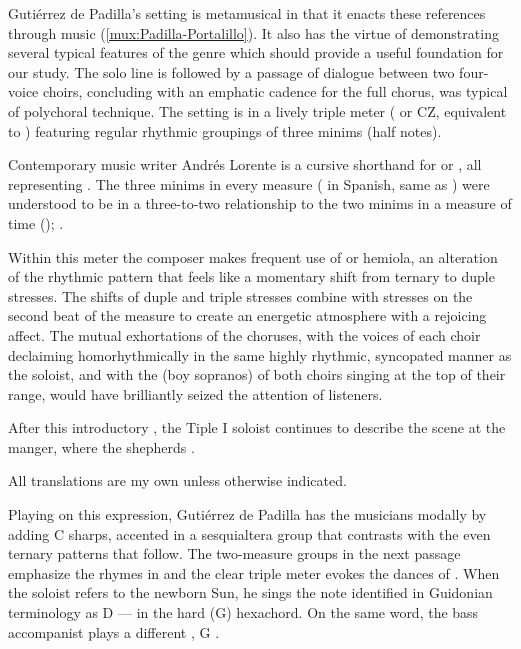 Gutiérrez de Padilla's setting is metamusical in that it enacts these
references through music (\cref{mux:Padilla-Portalillo}).
It also has the virtue of demonstrating several typical features of the genre
which should provide a useful foundation for our study.
The solo line is followed by a passage of dialogue between two four-voice
choirs, concluding with an emphatic cadence for the full chorus, was typical of
polychoral technique.
The setting is in a lively triple meter (\meterCZ{} or CZ, equivalent to
\meterCThree) featuring regular rhythmic groupings of three minims (half
notes).
\begin{Footnote}
    Contemporary music writer Andrés Lorente \meterCZ{} is a cursive shorthand
    for \meterCThreeTwo or \meterCThree, all representing .
    The three minims in every measure ( in Spanish, same as
    ) were understood to be in a three-to-two relationship to the
    two minims in a measure of  time ();
    \autocites
    [156, 165, 210]{Lorente:Porque}
    [537]{Cerone:Melopeo}
    [11]{Cashner:WLSCM32}.
\end{Footnote}
Within this meter the composer makes frequent use of  or
hemiola, an alteration of the rhythmic pattern that feels like a momentary
shift from ternary to duple stresses.
The shifts of duple and triple stresses combine with stresses on the second
beat of the measure to create an energetic atmosphere with a rejoicing affect.  
The mutual exhortations of the choruses, with the voices of each choir declaiming
homorhythmically in the same highly rhythmic, syncopated manner as the soloist,
and with the  (boy sopranos) of both choirs singing at the top of
their range, would have brilliantly seized the attention of listeners.

After this introductory , the Tiple I soloist continues to
describe the scene at the manger, where the shepherds .%
\begin{Footnote}
    All translations are my own unless otherwise indicated.
\end{Footnote}
Playing on this expression, Gutiérrez de Padilla has the musicians
 modally by adding C sharps, accented in a sesquialtera group that
contrasts with the even ternary patterns that follow.
The two-measure groups in the next passage emphasize the rhymes in
 and the clear triple meter evokes the
dances of .
When the soloist refers to the newborn Sun, he sings the note identified in
Guidonian terminology as D --- in the hard (G)
hexachord.  
On the same word, the bass accompanist plays a different , G
.

